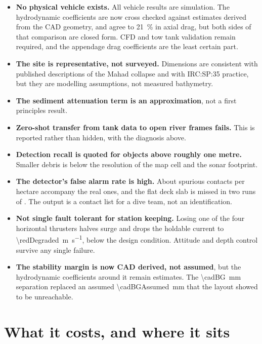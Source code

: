 \documentclass[10pt,a4paper]{article}
\begin{document}
\begin{itemize}[leftmargin=*,itemsep=2pt]
\item \textbf{No physical vehicle exists.} All vehicle results are simulation.
The hydrodynamic coefficients are now cross checked against estimates derived
from the CAD geometry, and agree to \SI{21}{\percent} in axial drag, but both
sides of that comparison are closed form. CFD and tow tank validation remain
required, and the appendage drag coefficients are the least certain part.
\item \textbf{The site is representative, not surveyed.} Dimensions are
consistent with published descriptions of the Mahad collapse and with
IRC:SP:35 practice, but they are modelling assumptions, not measured
bathymetry.
\item \textbf{The sediment attenuation term is an approximation}, not a first
principles result.
\item \textbf{Zero-shot transfer from tank data to open river frames fails.}
This is reported rather than hidden, with the diagnosis above.
\item \textbf{Detection recall is quoted for objects above roughly one metre.}
Smaller debris is below the resolution of the map cell and the sonar
footprint.
\item \textbf{The detector's false alarm rate is high.} About
\detFalsePerHa{} spurious contacts per hectare accompany the real ones, and the
flat deck slab is missed in two runs of \detRuns{}. The output is a contact
list for a dive team, not an identification.
\item \textbf{Not single fault tolerant for station keeping.} Losing one of
the four horizontal thrusters halves surge and drops the holdable current to
\SI{\redDegraded}{\metre\per\second}, below the design condition. Attitude and
depth control survive any single failure.
\item \textbf{The stability margin is now CAD derived, not assumed}, but the
hydrodynamic coefficients around it remain estimates. The
\SI{\cadBG}{\milli\metre} separation replaced an assumed
\SI{\cadBGAssumed}{\milli\metre} that the layout showed to be unreachable.
\end{itemize}

\section{What it costs, and where it sits}\label{sec:cost}
\end{document}
